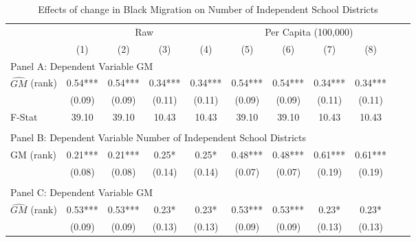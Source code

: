  \begin{table}[htbp]\centering {} \begin{threeparttable} \caption{Effects of change in Black Migration on Number of Independent School Districts} \begin{tabular}{l*{10}{c}} \toprule
                &\multicolumn{4}{c}{Raw}                                    &\multicolumn{4}{c}{Per Capita (100,000)}                   \\\cmidrule(lr){2-5}\cmidrule(lr){6-9}
                &\multicolumn{1}{c}{(1)}   &\multicolumn{1}{c}{(2)}   &\multicolumn{1}{c}{(3)}   &\multicolumn{1}{c}{(4)}   &\multicolumn{1}{c}{(5)}   &\multicolumn{1}{c}{(6)}   &\multicolumn{1}{c}{(7)}   &\multicolumn{1}{c}{(8)}   \\
\cmidrule(lr){1-9}
\multicolumn{8}{l}{Panel A: Dependent Variable GM}\\
\cmidrule(lr){1-9}
$\hat{GM}$ (rank)&       0.54***&       0.54***&       0.34***&       0.34***&       0.54***&       0.54***&       0.34***&       0.34***\\
                &     (0.09)   &     (0.09)   &     (0.11)   &     (0.11)   &     (0.09)   &     (0.09)   &     (0.11)   &     (0.11)   \\
\midrule
F-Stat          &      39.10   &      39.10   &      10.43   &      10.43   &      39.10   &      39.10   &      10.43   &      10.43   \\
\cmidrule[\heavyrulewidth](lr){1-9} \\ \cmidrule[\heavyrulewidth](lr){1-9}
\multicolumn{8}{l}{Panel B: Dependent Variable Number of Independent School Districts}\\
\cmidrule(lr){1-9}
GM  (rank)      &       0.21***&       0.21***&       0.25*  &       0.25*  &       0.48***&       0.48***&       0.61***&       0.61***\\
                &     (0.08)   &     (0.08)   &     (0.14)   &     (0.14)   &     (0.07)   &     (0.07)   &     (0.19)   &     (0.19)   \\
\cmidrule[\heavyrulewidth](lr){1-9} \\ \cmidrule[\heavyrulewidth](lr){1-9}
\multicolumn{8}{l}{Panel C: Dependent Variable GM}\\
\cmidrule(lr){1-9}
$\hat{GM}$ (rank)&       0.53***&       0.53***&       0.23*  &       0.23*  &       0.53***&       0.53***&       0.23*  &       0.23*  \\
                &     (0.09)   &     (0.09)   &     (0.13)   &     (0.13)   &     (0.09)   &     (0.09)   &     (0.13)   &     (0.13)   \\

\end{tabular}
\end{threeparttable}
\end{table}
